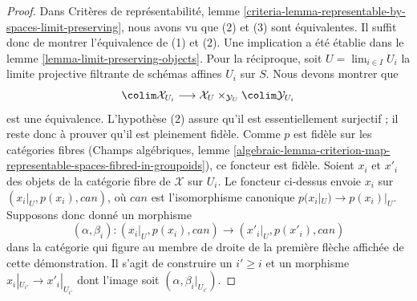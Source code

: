 \begin{proof}
Dans Critères de représentabilité, lemme
\ref{criteria-lemma-representable-by-spaces-limit-preserving}, nous avons vu
que (2) et (3) sont équivalentes. Il suffit donc de montrer l'équivalence de
(1) et (2). Une implication a été établie dans le lemme
\ref{lemma-limit-preserving-objects}. Pour la réciproque, soit
$U = \lim_{i \in I} U_i$ la limite projective filtrante de schémas affines
$U_i$ sur $S$. Nous devons montrer que
$$
\colim \mathcal{X}_{U_i} \longrightarrow
\mathcal{X}_U \times_{\mathcal{Y}_U} \colim \mathcal{Y}_{U_i}
$$
est une équivalence. L'hypothèse (2) assure qu'il est essentiellement
surjectif ; il reste donc à prouver qu'il est pleinement fidèle. Comme $p$
est fidèle sur les catégories fibres (Champs algébriques, lemme
\ref{algebraic-lemma-criterion-map-representable-spaces-fibred-in-groupoids}),
ce foncteur est fidèle. Soient $x_i$ et $x'_i$ des objets de la catégorie
fibre de $\mathcal{X}$ sur $U_i$. Le foncteur ci-dessus envoie $x_i$ sur
$(x_i|_U, p(x_i), can)$, où $can$ est l'isomorphisme canonique
$p(x_i|_U) \to p(x_i)|_U$. Supposons donc donné un morphisme
$$
(\alpha, \beta_i) : (x_i|_U, p(x_i), can) \longrightarrow
(x'_i|_U, p(x'_i), can)
$$
dans la catégorie qui figure au membre de droite de la première flèche
affichée de cette démonstration. Il s'agit de construire un $i' \geq i$ et un
morphisme $x_i|_{U_{i'}} \to x'_i|_{U_{i'}}$ dont l'image soit
$(\alpha, \beta_i|_{U_{i'}})$.


\end{proof}
